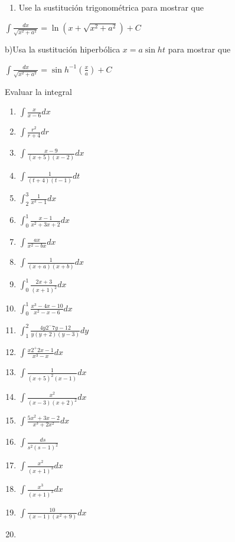 \documentclass[12pt,]{article}
\providecommand{\tightlist}{%
  \setlength{\itemsep}{0pt}\setlength{\parskip}{0pt}}
\begin{document}
\begin{enumerate}
\def\labelenumi{\alph{enumi})}
\tightlist
\item
  Use la sustitución trigonométrica para mostrar que
\end{enumerate}

\(\displaystyle\int\frac{dx}{\sqrt{x^2+a^2}}=\ln (x+\sqrt{x^2+a^2})+C\)

b)Usa la sustitución hiperbólica \(x=a \sin h t\) para mostrar que

\(\displaystyle\int\frac{dx}{\sqrt{x^2+a^2}}=\sin h^{-1}\left(\frac{x}{a}\right)+ C\)

Evaluar la integral

\begin{enumerate}
\def\labelenumi{\arabic{enumi}.}
\setcounter{enumi}{6}
\item
  \(\displaystyle\int\frac{x}{x-6}dx\)
\item
  \(\displaystyle\int\frac{r^2}{r+4}dr\)
\item
  \(\displaystyle\int\frac{x-9}{(x+5)(x-2)}dx\)
\item
  \(\displaystyle\int\frac{1}{(t+4)(t-1)}dt\)
\item
  \(\displaystyle\int_2^3\frac{1}{x^2-1}dx\)
\item
  \(\displaystyle\int_0^1\frac{x-1}{x^2+3x+2}dx\)
\item
  \(\displaystyle\int\frac{ax}{x^2-bx}dx\)
\item
  \(\displaystyle\int\frac{1}{(x+a)(x+b)}dx\)
\item
  \(\displaystyle\int_0^1\frac{2x+3}{(x+1)^2}dx\)
\item
  \(\displaystyle\int_0^1\frac{x^3-4x-10}{x^2-x-6}dx\)
\item
  \(\displaystyle\int_1^2\frac{4y2^-7y-12}{y(y+2)(y-3)}dy\)
\item
  \(\displaystyle\int\frac{x2^+2x-1}{x^3-x}dx\)
\item
  \(\displaystyle\int\frac{1}{(x+5)^2(x-1)}dx\)
\item
  \(\displaystyle\int\frac{x^2}{(x-3)(x+2)^2}dx\)
\item
  \(\displaystyle\int\frac{5x^2+3x-2}{x^3+2x^2}dx\)
\item
  \(\displaystyle\int\frac{ds}{s^2(s-1)^2}\)
\item
  \(\displaystyle\int\frac{x^2}{(x+1)^3}dx\)
\item
  \(\displaystyle\int\frac{x^3}{(x+1)^3}dx\)
\item
  \(\displaystyle\int\frac{10}{(x-1)(x^2+9)}dx\)
\item

\end{enumerate}
\end{document}
